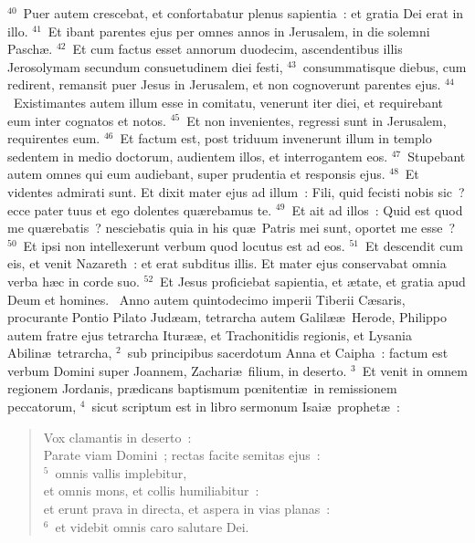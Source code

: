 ${}^{40}$~Puer autem crescebat, et confortabatur plenus sapientia~: et gratia Dei erat in illo.
${}^{41}$~Et ibant parentes ejus per omnes annos in Jerusalem, in die solemni Pasch\ae .
${}^{42}$~Et cum factus esset annorum duodecim, ascendentibus illis Jerosolymam secundum consuetudinem diei festi,
${}^{43}$~consummatisque diebus, cum redirent, remansit puer Jesus in Jerusalem, et non cognoverunt parentes ejus.
${}^{44}$~Existimantes autem illum esse in comitatu, venerunt iter diei, et requirebant eum inter cognatos et notos.
${}^{45}$~Et non invenientes, regressi sunt in Jerusalem, requirentes eum.
${}^{46}$~Et factum est, post triduum invenerunt illum in templo sedentem in medio doctorum, audientem illos, et interrogantem eos.
${}^{47}$~Stupebant autem omnes qui eum audiebant, super prudentia et responsis ejus.
${}^{48}$~Et videntes admirati sunt. Et dixit mater ejus ad illum~: Fili, quid fecisti nobis sic~? ecce pater tuus et ego dolentes qu\ae rebamus te.
${}^{49}$~Et ait ad illos~: Quid est quod me qu\ae rebatis~? nesciebatis quia in his qu\ae\ Patris mei sunt, oportet me esse~?
${}^{50}$~Et ipsi non intellexerunt verbum quod locutus est ad eos.
${}^{51}$~Et descendit cum eis, et venit Nazareth~: et erat subditus illis. Et mater ejus conservabat omnia verba h\ae c in corde suo.
${}^{52}$~Et Jesus proficiebat sapientia, et \ae tate, et gratia apud Deum et homines.
~Anno autem quintodecimo imperii Tiberii C\ae saris, procurante Pontio Pilato Jud\ae am, tetrarcha autem Galil\ae \ae\ Herode, Philippo autem fratre ejus tetrarcha Itur\ae \ae , et Trachonitidis regionis, et Lysania Abilin\ae\ tetrarcha,
${}^{2}$~sub principibus sacerdotum Anna et Caipha~: factum est verbum Domini super Joannem, Zachari\ae\ filium, in deserto.
${}^{3}$~Et venit in omnem regionem Jordanis, pr\ae dicans baptismum pœnitenti\ae\ in remissionem peccatorum,
${}^{4}$~sicut scriptum est in libro sermonum Isai\ae\ prophet\ae~: \begin{flushleft}\begin{verse}Vox clamantis in deserto~:\\ Parate viam Domini~; rectas facite semitas ejus~:\\
${}^{5}$~omnis vallis implebitur,\\ et omnis mons, et collis humiliabitur~:\\ et erunt prava in directa, et aspera in vias planas~:\\
${}^{6}$~et videbit omnis caro salutare Dei.\end{verse}\end{flushleft}


